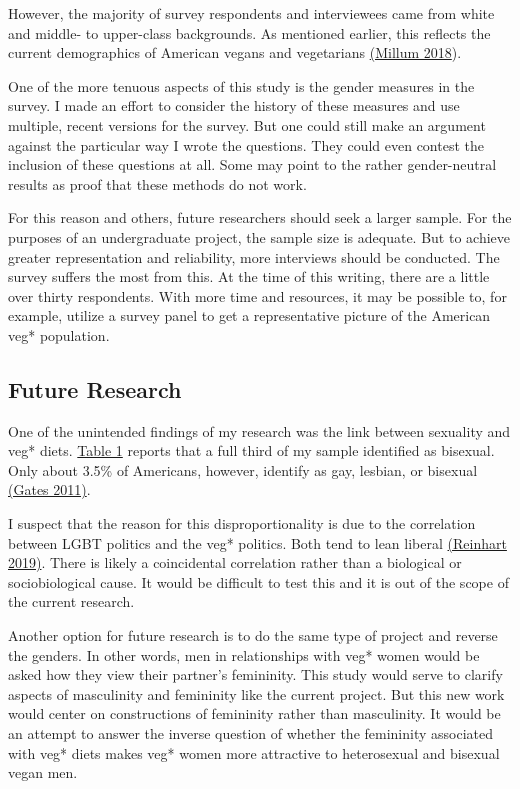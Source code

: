 \documentclass[twoside]{report}
\begin{document}
\begin{multicols*}{2}
However, the majority of survey respondents and interviewees came from
white and middle- to upper-class backgrounds. As mentioned earlier, this reflects the current demographics of American vegans and vegetarians \hyperlink{millum}{(Millum 2018}).

One of the more tenuous aspects of this study is the gender measures in
the survey. I made an effort to consider the history of these measures
and use multiple, recent versions for the survey. But one could still
make an argument against the particular way I wrote the questions. They
could even contest the inclusion of these questions at all. Some may
point to the rather gender-neutral results as proof that these methods
do not work.

For this reason and others, future researchers should seek a larger
sample. For the purposes of an undergraduate project, the sample size is
adequate. But to achieve greater representation and reliability, more
interviews should be conducted. The survey suffers the most from this.
At the time of this writing, there are a little over thirty respondents. 
With more time and resources, it may be possible to, for example, utilize a survey
panel to get a representative picture of the American veg* population.

\hypertarget{future-research}{\subsection{Future Research}}

One of the unintended findings of my research was the link between
sexuality and veg* diets. \hyperlink{table-1}{Table 1} reports that a full third of my sample identified as bisexual. Only about 3.5\% of Americans, however, identify as gay, lesbian, or bisexual \hyperlink{gates}{(Gates 2011)}. 

I suspect that the reason for this disproportionality is due to the correlation between LGBT politics and the veg* politics. Both tend to lean liberal \hyperlink{reinhart}{(Reinhart 2019)}. There is likely a coincidental correlation rather than a biological or sociobiological cause. It would be difficult to test this and it is out of the scope of the current research.

Another option for future research is to do the same type of project and reverse the genders. In other words, men in relationships with
veg* women would be asked how they view their partner's femininity. This
study would serve to clarify aspects of masculinity and femininity
like the current project. But this new work would center on
constructions of femininity rather than masculinity. It would be an
attempt to answer the inverse question of whether the femininity
associated with veg* diets makes veg* women more attractive to
heterosexual and bisexual vegan men.


\end{multicols*}
\end{document}
